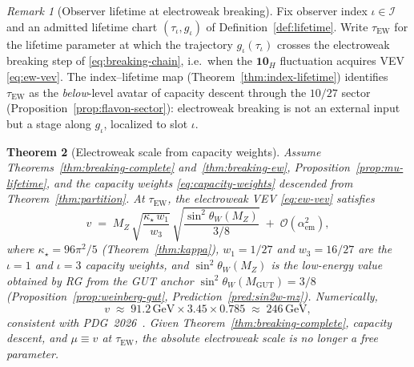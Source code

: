 \documentclass[aps,prd,onecolumn,amsmath,amssymb,nofootinbib,11pt]{revtex4-2}
\numberwithin{equation}{section}
\theoremstyle{plain}
\newtheorem{theorem}{Theorem}[section]
\theoremstyle{definition}
\theoremstyle{remark}
\newtheorem{remark}[theorem]{Remark}
\begin{document}
\begin{remark}[Observer lifetime at electroweak breaking]
\label{rmk:tau-ew}
Fix observer index $\iota\in\mathcal{I}$ and an admitted lifetime chart
$(\tau_\iota,g_\iota)$ of Definition~\ref{def:lifetime}. Write
$\tau_{\mathrm{EW}}$ for the lifetime parameter at which the trajectory
$g_\iota(\tau_\iota)$ crosses the electroweak breaking step of
\eqref{eq:breaking-chain}, i.e.\ when the $\mathbf{10}_H$ fluctuation
acquires VEV \eqref{eq:ew-vev}. The index--lifetime map
(Theorem~\ref{thm:index-lifetime}) identifies $\tau_{\mathrm{EW}}$ as the
\emph{below}-level avatar of capacity descent through the $10/27$ sector
(Proposition~\ref{prop:flavon-sector}): electroweak breaking is not an
external input but a stage along $g_\iota$, localized to slot $\iota$.
\end{remark}

\begin{theorem}[Electroweak scale from capacity weights]\label{thm:ew-scale-value}
Assume Theorems~\ref{thm:breaking-complete} and~\ref{thm:breaking-ew},
Proposition~\ref{prop:mu-lifetime}, and the capacity weights
\eqref{eq:capacity-weights} descended from Theorem~\ref{thm:partition}.
At $\tau_{\mathrm{EW}}$, the electroweak VEV \eqref{eq:ew-vev} satisfies
\begin{equation}\label{eq:v-capacity}
  v
  \;=\;
  M_Z\,
  \sqrt{\frac{\kappa_\star\,w_1}{w_3}}\,
  \sqrt{\frac{\sin^2\theta_W(M_Z)}{3/8}}
  \;+\;\mathcal{O}(\alpha_{\mathrm{em}}^2),
\end{equation}
where $\kappa_\star=96\pi^2/5$ (Theorem~\ref{thm:kappa}),
$w_1=1/27$ and $w_3=16/27$ are the $\iota=1$ and $\iota=3$ capacity weights,
and $\sin^2\theta_W(M_Z)$ is the low-energy value obtained by RG from the GUT
anchor $\sin^2\theta_W(M_{\mathrm{GUT}})=3/8$
(Proposition~\ref{prop:weinberg-gut}, Prediction~\ref{pred:sin2w-mz}).
Numerically,
\begin{equation}\label{eq:v-numeric}
  v
  \;\approx\;
  91.2\,\mathrm{GeV}\times 3.45\times 0.785
  \;\approx\;
  246\,\mathrm{GeV},
\end{equation}
consistent with PDG~2026~\cite{PDG2025}. Given Theorem~\ref{thm:breaking-complete}, capacity descent, and
$\mu\equiv v$ at $\tau_{\mathrm{EW}}$, the absolute electroweak scale is no
longer a free parameter.
\end{theorem}
\end{document}
